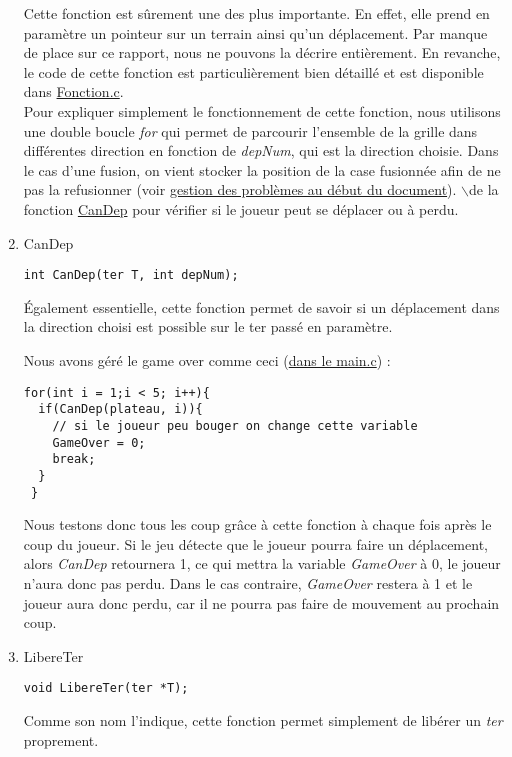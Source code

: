 \documentclass[letter]{article}
\begin{document}
\begin{enumerate}
Cette fonction est sûrement une des plus importante. En effet, elle prend en paramètre un pointeur sur un terrain ainsi qu'un déplacement. 
Par manque de place sur ce rapport, nous ne pouvons la décrire entièrement. En revanche, le code de cette fonction est particulièrement bien détaillé et est disponible dans \href{FonctionJeu.c}{Fonction.c}.\\
Pour expliquer simplement le fonctionnement de cette fonction, nous utilisons une double boucle \emph{for} qui permet de parcourir l'ensemble de la grille dans différentes direction en fonction de \emph{depNum}, qui est la direction choisie. Dans le cas d'une fusion, on vient stocker la position de la case fusionnée afin de ne pas la refusionner (voir \hyperref[sec:orgdda6988]{gestion des problèmes au début du document}).
$\backslash$ de la fonction \hyperref[sec:org873dbfd]{CanDep} pour vérifier si le joueur peut se déplacer ou à perdu.

\item CanDep
\label{sec:org873dbfd}

\begin{verbatim}
int CanDep(ter T, int depNum);
\end{verbatim}

Également essentielle, cette fonction permet de savoir si un déplacement dans la direction choisi est possible sur le ter passé en paramètre.

Nous avons géré le game over comme ceci (\href{main.c}{dans le main.c}) :
\begin{verbatim}
for(int i = 1;i < 5; i++){
  if(CanDep(plateau, i)){
    // si le joueur peu bouger on change cette variable
    GameOver = 0;
    break;
  }
 }
\end{verbatim}

Nous testons donc tous les coup grâce à cette fonction à chaque fois après le coup du joueur. Si le jeu détecte que le joueur pourra faire un déplacement, alors \emph{CanDep} retournera 1, ce qui mettra la variable \emph{GameOver} à 0, le joueur n'aura donc pas perdu. Dans le cas contraire, \emph{GameOver} restera à 1 et le joueur aura donc perdu, car il ne pourra pas faire de mouvement au prochain coup.

\item LibereTer
\label{sec:org523b9f6}

\begin{verbatim}
void LibereTer(ter *T);
\end{verbatim}

Comme son nom l'indique, cette fonction permet simplement de libérer un \emph{ter} proprement.


\end{enumerate}
\end{document}
